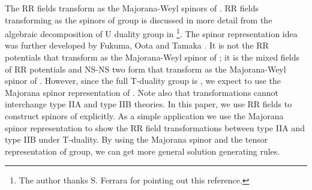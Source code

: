 \documentclass[a4paper,12pt]{article}
\begin{document}
The RR fields transform as 
the Majorana-Weyl spinors of \coordHE{} \cite{brace98}.
RR fields transforming as the spinors of \coordHE{}
group is discussed in more detail from the algebraic
decomposition of U duality group in \cite{andrianopoli96}
\footnote{The author thanks S. Ferrara for pointing out
this reference.}.
The spinor representation idea was further developed by
Fukuma, Oota and Tamaka \cite{fukuma99}. It is not
the RR potentials that transform as the 
Majorana-Weyl spinor of \coordHE{}; it is the mixed
fields of RR potentials and NS-NS two form that
transform as the Majorana-Weyl spinor of \coordHE{}.
However, since the full T-duality group is \coordHE{},
we expect to use the Majorana spinor representation
of \coordHE{}. Note also that \coordHE{} transformations
cannot interchange type IIA and type IIB theories.
In this paper, we use RR fields to construct spinors
of \coordHE{} explicitly.
As a simple application
we use the Majorana spinor representation
to show the RR field transformations between
type IIA and type IIB under T-duality. By
using the Majorana spinor and the tensor
representation of \coordHE{} group, we can get
more general solution generating rules.
\end{document}
